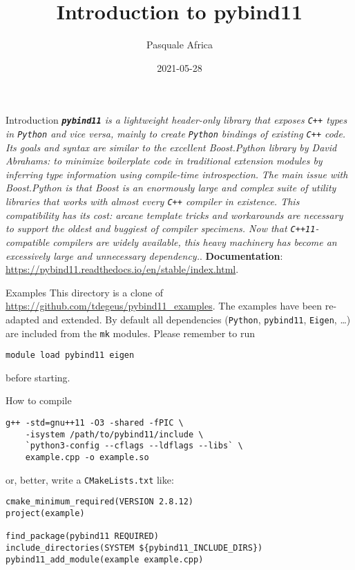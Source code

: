 \documentclass[aspectratio=169,11pt]{beamer}
\title{Introduction to pybind11}
\author{Pasquale Africa}
\institute{Politecnico di Milano}
\date{2021-05-28}
\begin{document}
\begin{frame}[plain]{}
    \maketitle
\end{frame}

\begin{frame}{Introduction}
    \textit{\textbf{\texttt{pybind11}} is a lightweight header-only library that exposes \texttt{C++} types in \texttt{Python} and vice versa, mainly to create \texttt{Python} bindings of existing \texttt{C++} code.}
    \vfill
    \textit{Its goals and syntax are similar to the excellent Boost.Python library by David Abrahams: to minimize boilerplate code in traditional extension modules by inferring type information using compile-time introspection.}
    \vfill
    \textit{The main issue with Boost.Python is that Boost is an enormously large and complex suite of utility libraries that works with almost every \texttt{C++} compiler in existence. This compatibility has its cost: arcane template tricks and workarounds are necessary to support the oldest and buggiest of compiler specimens. Now that \texttt{C++11}-compatible compilers are widely available, this heavy machinery has become an excessively large and unnecessary dependency.}.
    \vfill
    \textbf{Documentation}: \url{https://pybind11.readthedocs.io/en/stable/index.html}.
\end{frame}

\begin{frame}[fragile]{Examples}
    This directory is a clone of \url{https://github.com/tdegeus/pybind11_examples}.
    \vfill
    The examples have been re-adapted and extended. By default all dependencies (\texttt{Python}, \texttt{pybind11}, \texttt{Eigen}, \dots) are included from the \texttt{mk} modules.
    \vfill
    Please remember to run
    \begin{verbatim}
module load pybind11 eigen
    \end{verbatim}
    before starting.
\end{frame}

\begin{frame}[fragile]{How to compile}
    \begin{verbatim}
g++ -std=gnu++11 -O3 -shared -fPIC \
    -isystem /path/to/pybind11/include \
    `python3-config --cflags --ldflags --libs` \
    example.cpp -o example.so
    \end{verbatim}
    or, better, write a \texttt{CMakeLists.txt} like:
    \begin{verbatim}
cmake_minimum_required(VERSION 2.8.12)
project(example)

find_package(pybind11 REQUIRED)
include_directories(SYSTEM ${pybind11_INCLUDE_DIRS})
pybind11_add_module(example example.cpp)
    \end{verbatim}
\end{frame}
\end{document}
